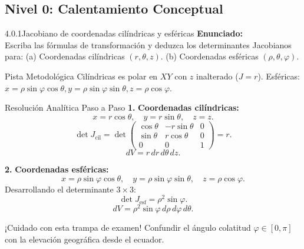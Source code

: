 \documentclass[11pt,a4paper]{article}
\begin{document}
\subsection{Nivel 0: Calentamiento Conceptual}

\begin{nivelbox}{4.0.1}{Jacobiano de coordenadas cilíndricas y esféricas}
\textbf{Enunciado:}\\
Escriba las fórmulas de transformación y deduzca los determinantes Jacobianos para:
(a) Coordenadas cilíndricas $(r, \theta, z)$.
(b) Coordenadas esféricas $(\rho, \theta, \varphi)$.

\begin{observacionbox}{Pista Metodológica}
Cilíndricas es polar en $XY$ con $z$ inalterado ($J = r$). Esféricas: $x = \rho\sin\varphi\cos\theta, y = \rho\sin\varphi\sin\theta, z = \rho\cos\varphi$.
\end{observacionbox}

\begin{ejerciciobox}{Resolución Analítica Paso a Paso}
\smallskip\noindent\textbf{1.} \textbf{Coordenadas cilíndricas:}
\[x = r\cos\theta, \quad y = r\sin\theta, \quad z = z.\]
\[\det J_{\text{cil}} = \det \begin{pmatrix} \cos\theta & -r\sin\theta & 0 \\ \sin\theta & r\cos\theta & 0 \\ 0 & 0 & 1 \end{pmatrix} = r.\]
\[dV = r \, dr \, d\theta \, dz.\]

\smallskip\noindent\textbf{2.} \textbf{Coordenadas esféricas:}
\[x = \rho\sin\varphi\cos\theta, \quad y = \rho\sin\varphi\sin\theta, \quad z = \rho\cos\varphi.\]
Desarrollando el determinante $3 \times 3$:
\[\det J_{\text{esf}} = \rho^2 \sin\varphi.\]
\[dV = \rho^2 \sin\varphi \, d\rho \, d\varphi \, d\theta.\]
\end{ejerciciobox}

\begin{errorbox}{¡Cuidado con esta trampa de examen!}
Confundir el ángulo colatitud $\varphi \in [0, \pi]$ con la elevación geográfica desde el ecuador.
\end{errorbox}
\end{nivelbox}
\bigskip
\end{document}

